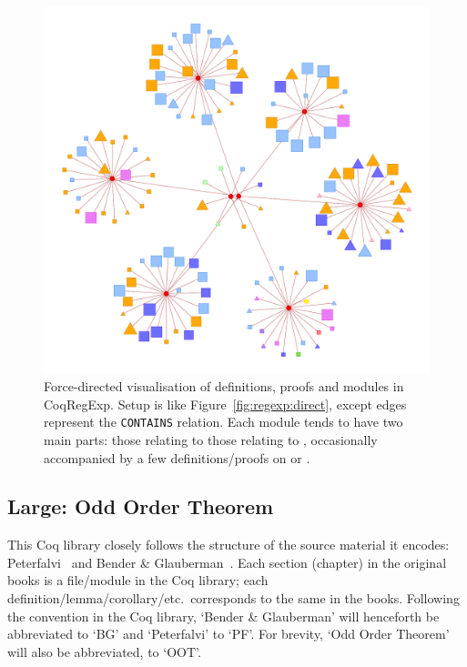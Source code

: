 \begin{figure}[tp]
\centering
\includegraphics[height=0.3\textheight]{img/regexp/module.png}
\caption{Force-directed visualisation of definitions, proofs and modules in
  CoqRegExp. Setup is like Figure~\ref{fig:regexp:direct}, except
  edges represent the \texttt{CONTAINS} relation. Each module tends to have two
  main parts: those relating to  those relating to
  , occasionally accompanied by a few
  definitions/proofs on  or .}\label{fig:regexp:module}
\end{figure}

\subsection{Large: Odd Order Theorem}

This Coq library closely follows the structure of the source material it
encodes: Peterfalvi~{\citep{peterfalvi2000oot}} and Bender \&
Glauberman~{\citep{bender1994oot}}. Each section (chapter) in the original books is
a file/module in the Coq library; each definition/lemma/corollary/etc.\
corresponds to the same in the books. Following the convention in the Coq
library, `Bender \& Glauberman' will henceforth be abbreviated to `BG' and
`Peterfalvi' to `PF'. For brevity, `Odd Order Theorem' will also be abbreviated,
to `OOT'.

